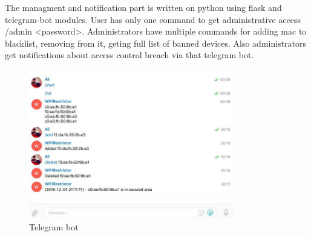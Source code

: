 \documentclass[a4paper,11pt]{article}
\begin{document}
The managment and notification part is written on python using flask and telegram-bot modules. User has only one command to get administrative access /admin <password>. Administrators have multiple commands for adding mac to blacklist, removing from it, geting full list of banned devices. Also administrators get notifications about access control breach via that telegram bot.

\begin{figure}[h]
    \centering
    \includegraphics[width=0.8\textwidth]{bot}
    \caption{Telegram bot}
    \label{fig:bot}
\end{figure}
\end{document}
